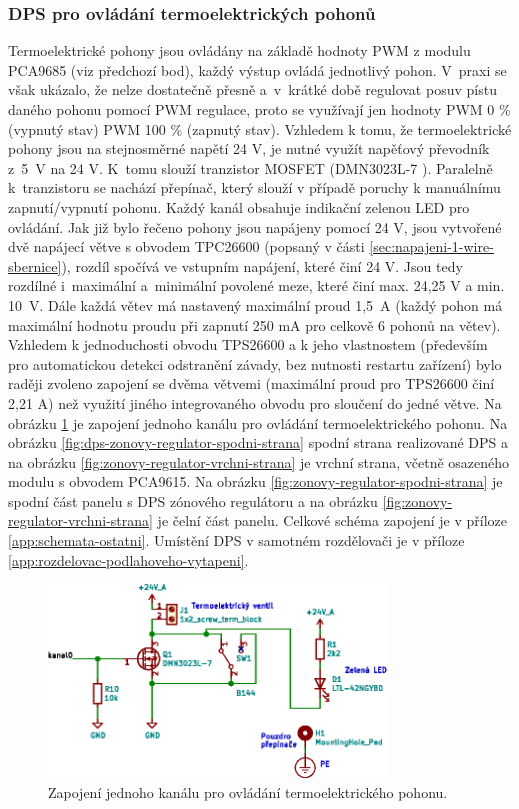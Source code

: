 \subsubsection{DPS pro ovládání termoelektrických pohonů}
Termoelektrické pohony jsou ovládány na základě hodnoty PWM z modulu PCA9685 (viz předchozí bod), každý výstup ovládá jednotlivý pohon. V~praxi se však ukázalo, že nelze dostatečně přesně a~v~krátké době regulovat posuv pístu daného pohonu pomocí PWM regulace, proto se využívají jen hodnoty PWM 0 \% (vypnutý stav) PWM 100 \% (zapnutý stav). Vzhledem k tomu, že termoelektrické pohony jsou na stejnosměrné napětí 24 V, je nutné využít napěťový převodník z~5~V na 24 V. K~tomu slouží tranzistor MOSFET (DMN3023L-7 \cite{dmn3023l}). Paralelně k~tranzistoru se nachází přepínač, který slouží v případě poruchy k manuálnímu zapnutí/vypnutí pohonu.  Každý kanál obsahuje indikační zelenou LED pro ovládání. Jak již bylo řečeno pohony jsou napájeny pomocí 24 V, jsou vytvořené dvě napájecí větve s obvodem TPC26600 (popsaný v části \ref{sec:napajeni-1-wire-sbernice}), rozdíl spočívá ve vstupním napájení, které činí 24 V. Jsou tedy rozdílné i~maximální a~minimální povolené meze, které činí max. 24,25 V a min. 10~V. Dále každá větev má nastavený maximální proud 1,5~A (každý pohon má maximální hodnotu proudu při zapnutí 250 mA pro celkově 6 pohonů na větev). Vzhledem k jednoduchosti obvodu TPS26600 a k jeho vlastnostem (především pro automatickou detekci odstranění závady, bez nutnosti restartu zařízení) bylo raději zvoleno zapojení se dvěma větvemi (maximální proud pro TPS26600 činí 2,21 A) než využití jiného integrovaného obvodu pro sloučení do jedné větve. Na obrázku \ref{fig:zonovy-regulator-mosfet-pwm-1-kanal} je zapojení jednoho kanálu pro ovládání termoelektrického pohonu.  Na obrázku \ref{fig:dps-zonovy-regulator-spodni-strana} spodní strana realizované DPS a na obrázku \ref{fig:zonovy-regulator-vrchni-strana} je vrchní strana, včetně osazeného modulu s obvodem PCA9615. Na obrázku \ref{fig:zonovy-regulator-spodni-strana} je spodní část panelu s DPS zónového regulátoru a na obrázku \ref{fig:zonovy-regulator-vrchni-strana} je čelní část panelu. Celkové schéma zapojení je v příloze \ref{app:schemata-ostatni}. Umístění DPS v samotném rozdělovači je v příloze \ref{app:rozdelovac-podlahoveho-vytapeni}.


\begin{figure}[H]
    \centering
    \includegraphics[width=0.8\textwidth]{images/svg/kicad/zonovy-regulator-mosfet-pwm-1-kanal.eps}
    \caption{Zapojení jednoho kanálu pro ovládání termoelektrického pohonu.}
    \label{fig:zonovy-regulator-mosfet-pwm-1-kanal}
\end{figure}

